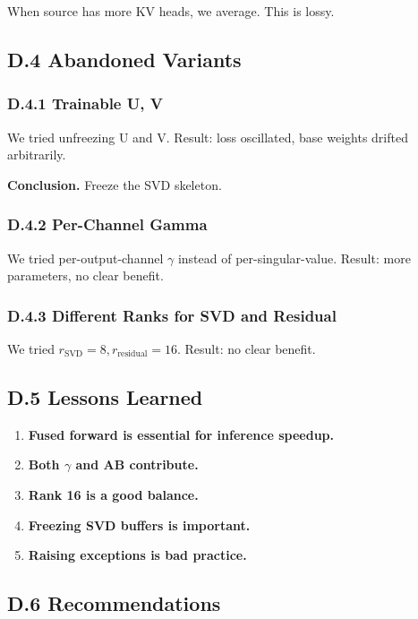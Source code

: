 When source has more KV heads, we average. This is lossy.

\subsection{D.4 Abandoned Variants}

\subsubsection{D.4.1 Trainable U, V}

We tried unfreezing U and V. Result: loss oscillated, base weights drifted 
arbitrarily.

\textbf{Conclusion.} Freeze the SVD skeleton.

\subsubsection{D.4.2 Per-Channel Gamma}

We tried per-output-channel $\gamma$ instead of per-singular-value. Result: more 
parameters, no clear benefit.

\subsubsection{D.4.3 Different Ranks for SVD and Residual}

We tried $r_\text{SVD} = 8, r_\text{residual} = 16$. Result: no clear 
benefit.

\subsection{D.5 Lessons Learned}

\begin{enumerate}
\item \textbf{Fused forward is essential for inference speedup.}
\item \textbf{Both $\gamma$ and AB contribute.}
\item \textbf{Rank 16 is a good balance.}
\item \textbf{Freezing SVD buffers is important.}
\item \textbf{Raising exceptions is bad practice.}

\end{enumerate}
\subsection{D.6 Recommendations}

